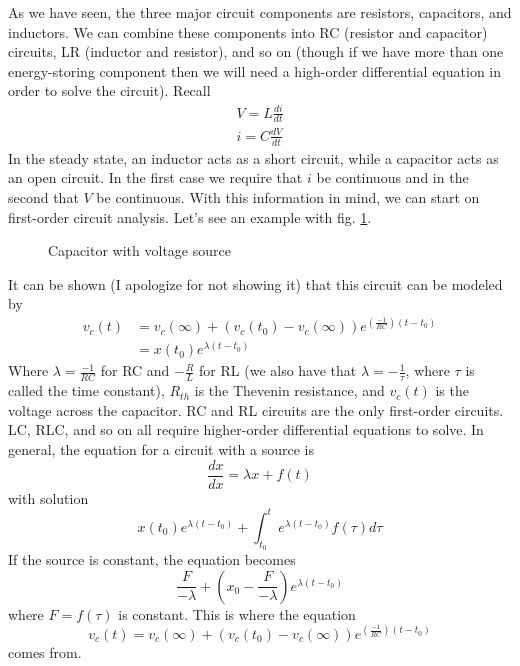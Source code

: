 \documentclass[nobib]{tufte-handout}
\begin{document}
As we have seen, the three major circuit components are resistors, 
capacitors, and inductors. We can combine these components into 
RC (resistor and capacitor) circuits, LR (inductor and resistor), 
and so on (though if we have more than one energy-storing component then 
we will need a high-order differential equation in order to solve the 
circuit). Recall 
\begin{align*}
    V = L \frac{di}{dt} \\
    i = C\frac{dV}{dt}
\end{align*}
In the steady state, an inductor acts as a short circuit, 
while a capacitor acts as an open circuit. In the first case we 
require that $i$ be continuous and in the second that $V$ be 
continuous. With this information in mind, we can start on first-order 
circuit analysis. Let's see an example with fig. \ref{fig:capvolt}. 
\begin{figure}
    \center
    \caption{Capacitor with voltage source}
    \label{fig:capvolt}
\end{figure}

It can be shown (I apologize for not showing it) that this circuit
can be modeled by
\begin{align*}
    v_c(t) &= v_c(\infty) +\left(v_c(t_0) - v_c(\infty)\right)e^{(\frac{-1}{RC})(t - t_0)} \\
    &= x(t_0)e^{\lambda (t-t_0)}
\end{align*}
Where $\lambda = \frac{-1}{RC}$ for RC and $-\frac{R}{L}$ for RL (we also have that 
$\lambda = -\frac{1}{\tau}$, where $\tau$ is called the time constant), 
$R_{th}$ is the Thevenin resistance, and $v_c(t)$ is the 
voltage across the capacitor. RC and RL circuits are the only first-order circuits. LC, RLC, and so on all require higher-order
differential equations to solve. 
In general, the equation for a circuit with a source is 
\[\frac{dx}{dx} = \lambda x + f(t)\]
with solution 
\[x(t_0)e^{\lambda(t - t_0)} + \int_{t_0}^{t} e^{\lambda(t - t_0)} f(\tau) d\tau\]
If the source is constant, the equation becomes 
\[\frac{F}{-\lambda} + (x_0 - \frac{F}{-\lambda}) e^{\lambda(t - t_0)}\]
where $F = f(\tau)$ is constant. This is where the equation 
\[v_c(t) = v_c(\infty) +\left(v_c(t_0) - v_c(\infty)\right)e^{(\frac{-1}{RC})(t - t_0)}\]
comes from. 
\end{document}
